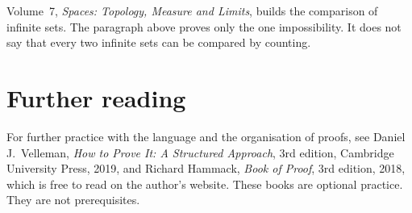 
Volume~7, \emph{Spaces: Topology, Measure and Limits}, builds the comparison of infinite sets. The paragraph above proves only the one impossibility. It does not say that every two infinite sets can be compared by counting.

\section*{Further reading}
For further practice with the language and the organisation of proofs, see Daniel J.~Velleman, \emph{How to Prove It: A Structured Approach}, 3rd edition, Cambridge University Press, 2019, and Richard Hammack, \emph{Book of Proof}, 3rd edition, 2018, which is free to read on the author's website. These books are optional practice. They are not prerequisites.
